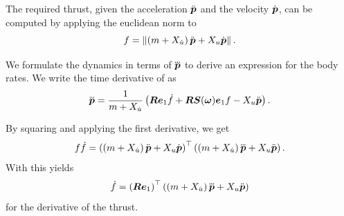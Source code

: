 The required thrust, given the acceleration $\mbox{$\ddot{\bm{p}}$}$ and the velocity $\mbox{$\dot{\bm{p}}$}$, can be computed by applying the euclidean norm to 
\begin{equation}
	\label{eq:trajectory-thrust}
	f =
	\left\lVert
	\left(m + X_{\dot{u}}\right) \mbox{$\ddot{\bm{p}}$} + X_u \mbox{$\dot{\bm{p}}$}
	\right\rVert.
\end{equation}

We formulate the dynamics in terms of $\mbox{$\dddot{\bm{p}}$}$ to derive an expression for the body rates.
We write the time derivative of  as
\begin{equation}
	\label{eq:jerk}
	\mbox{$\dddot{\bm{p}}$} = 
	\frac{1}{m + X_{\dot{u}}}
	\left(
		\mbox{$\bm{R}$} \mbox{$\bm{e}$}_1 \mbox{$\dot{f}$} 
		+ \mbox{$\bm{R}$} \mbox{$\bm{S}$}(\mbox{$\bm{\omega}$})\mbox{$\bm{e}$}_1 f
		- X_u \mbox{$\ddot{\bm{p}}$}
	\right)
	.
\end{equation}

By squaring  and applying the first derivative, we get
\begin{equation}
	f\mbox{$\dot{f}$} = 
	\left(
		\left(m + X_{\dot{u}}\right) \mbox{$\ddot{\bm{p}}$}
		+ X_u \mbox{$\dot{\bm{p}}$}
	\right)^\top
	\left(
		\left(m + X_{\dot{u}}\right) \mbox{$\dddot{\bm{p}}$}
		+ X_u \mbox{$\ddot{\bm{p}}$}
	\right).
\end{equation}
With  this yields
\begin{equation}
	\label{eq:fdot}
	\mbox{$\dot{f}$} = \left(\mbox{$\bm{R}$} \mbox{$\bm{e}$}_1\right)^\top
	\left(
		\left(m + X_{\dot{u}}\right) \mbox{$\dddot{\bm{p}}$}
		+ X_u \mbox{$\ddot{\bm{p}}$}
	\right)
\end{equation}
for the derivative of the thrust.

